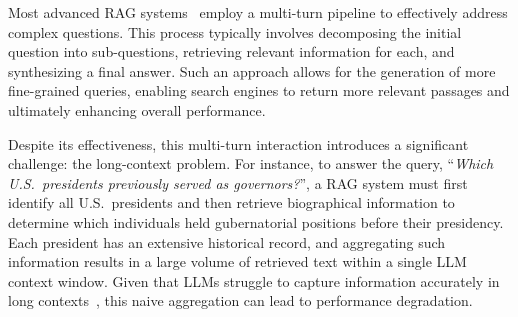 

Most advanced RAG systems~\cite{PoG, Search-o1, RoG, shao2023enhancing, khattab2022demonstrate} employ a multi-turn pipeline to effectively address complex questions. This process typically involves decomposing the initial question into sub-questions, retrieving relevant information for each, and synthesizing a final answer. Such an approach allows for the generation of more fine-grained queries, enabling search engines to return more relevant passages and ultimately enhancing overall performance.

Despite its effectiveness, this multi-turn interaction introduces a significant challenge: the long-context problem. 
For instance, to answer the query, ``\textit{Which U.S.\ presidents previously served as governors?}'', a RAG system must first identify all U.S.\ presidents and then retrieve biographical information to determine which individuals held gubernatorial positions before their presidency. 
Each president has an extensive historical record, and aggregating such information results in a large volume of retrieved text within a single LLM context window. Given that LLMs struggle to capture information accurately in long contexts~\cite{liu2024lost}, this naive aggregation can lead to performance degradation.

